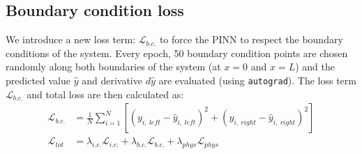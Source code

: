 \documentclass[we,twoside,openright,a4paper,11pt]{uantwerpenbamathesis}
\begin{document}
\subsection{Boundary condition loss}
We introduce a new loss term: $\mathcal{L}_{b.c.}$ to force the PINN to respect the boundary conditions of the system. Every epoch, 50 boundary condition points are chosen randomly along both boundaries of the system (at $x=0$ and $x=L$) and the predicted value $\hat y$ and derivative $d\hat y$ are evaluated (using \verb|autograd|). The loss term $\mathcal{L}_{b.c.}$ and total loss are then calculated as:
\begin{equation}
    \begin{split}
        \mathcal{L}_{b.c.} &= \frac{1}{N}\sum^N_{i=1}\left[(y_{i,\ left}-\hat y_{i,\ left})^2 + (y_{i,\ right}-\hat y_{i,\ right})^2\right]\\
        \mathcal{L}_{tot} &= \lambda_{i.c.}\mathcal{L}_{i.c.} + \lambda_{b.c.}\mathcal{L}_{b.c.} + \lambda_{phys}\mathcal{L}_{phys}
    \end{split}
\end{equation}
\end{document}
